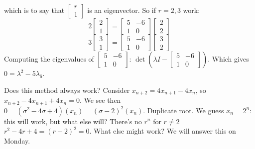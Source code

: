 \documentclass{article}
\theoremstyle{plain}
\theoremstyle{remark}
\begin{document}
which is to say that $\begin{bmatrix} r \\ 1 \end{bmatrix}$ is an eigenvector.
So if $r = 2,3$ work:
\[
	2\begin{bmatrix} 2 \\ 1 \end{bmatrix} = \begin{bmatrix} 5 & -6 \\ 1 & 0 \end{bmatrix}
	\begin{bmatrix} 2 \\ 2 \end{bmatrix}
\]
\[
	3\begin{bmatrix} 3 \\ 1 \end{bmatrix} = \begin{bmatrix} 5 & -6 \\ 1 & 0 \end{bmatrix}
	\begin{bmatrix} 3 \\ 2 \end{bmatrix}
\]
Computing the eigenvalues of $\begin{bmatrix} 5 & -6 \\ 1 & 0 \end{bmatrix}$:
$\det(\lambda I - \begin{bmatrix} 5 & -6 \\ 1 & 0 \end{bmatrix})$.
Which gives $0= \lambda^2 - 5\lambda _ 6$.

Does this method always work?
Consider $x_{n+2} = 4x_{n+1} - 4x_n$,
so $x_{n+2} - 4x_{n+1} + 4x_n = 0$.
We see then $0 = (\sigma^2-4\sigma+4)(x_n) = (\sigma-2)^2(x_n)$.
Duplicate root.
We guess $x_n = 2^n$: this will work, but what else will?
There's no $r^n$ for $r \neq 2$
$r^2 - 4r + 4 = (r-2)^2 = 0$.
What else might work?
We will answer this on Monday.
\end{document}

